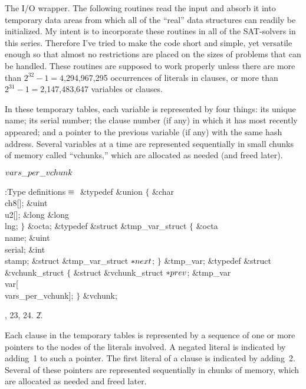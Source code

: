 The I/O wrapper. The following routines read the input and absorb it
into
temporary data areas from which all of the ``real'' data structures
can readily be initialized. My intent is to incorporate these routines in all
of the SAT-solvers in this series. Therefore I've tried to make the code
short and simple, yet versatile enough so that almost no restrictions are
placed on the sizes of problems that can be handled. These routines are
supposed to work properly unless there are more than
$2^{32}-1=4$,294,967,295 occurrences of literals in clauses,
or more than $2^{31}-1=2$,147,483,647 variables or clauses.

In these temporary tables, each variable is represented by four things:
its unique name; its serial number; the clause number (if any) in which it has
most recently appeared; and a pointer to the previous variable (if any)
with the same hash address. Several variables at a time
are represented sequentially in small chunks of memory called ``vchunks,''
which are allocated as needed (and freed later).

\Y\B\4\D$\\{vars\_per\_vchunk}$ \5
\par
\Y\B\4:Type definitions\X${}\equiv{}$\6
\&{typedef} \&{union} ${}\{{}$\1\6
\&{char} \\{ch8}[];\6
\&{uint} \\{u2}[];\6
\&{long} \&{long} \\{lng};\2\6
${}\}{}$ \&{octa};\6
\&{typedef} \&{struct} \&{tmp\_var\_struct} ${}\{{}$\1\6
\&{octa} \\{name};\6
\&{uint} \\{serial};\6
\&{int} \\{stamp};\6
\&{struct} \&{tmp\_var\_struct} ${}{*}\\{next}{}$;\2%
\6
${}\}{}$ \&{tmp\_var};\7
\&{typedef} \&{struct} \&{vchunk\_struct} ${}\{{}$\1\6
\&{struct} \&{vchunk\_struct} ${}{*}\\{prev}{}$;\6
\&{tmp\_var} \\{var}[\\{vars\_per\_vchunk}];\2\6
${}\}{}$ \&{vchunk};\par
{}, 23, 24.
\U2.\fi

Each clause in the temporary tables is represented by a sequence of
one or more pointers to the  nodes of the literals involved.
A negated literal is indicated by adding~1 to such a pointer.
The first literal of a clause is indicated by adding~2.
Several of these pointers are represented sequentially in chunks
of memory, which are allocated as needed and freed later.

